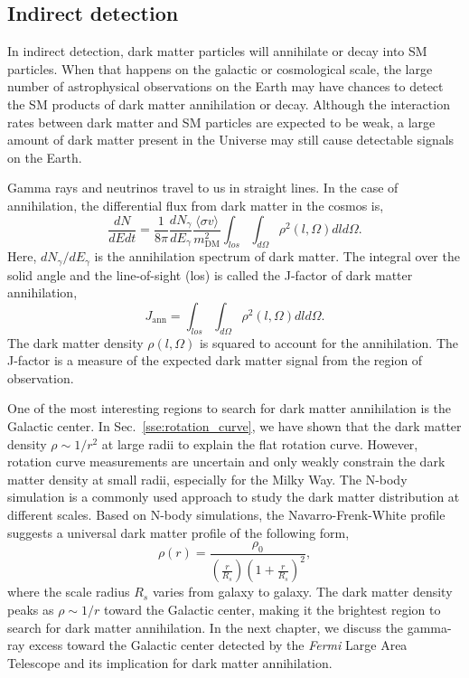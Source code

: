 \documentclass[doublespace,nopageskip]{VTthesis} %
\newcommand{\sigmav}{\langle\sigma v\rangle}
\begin{document}
\subsection{Indirect detection}\label{sse:indirect}

In indirect detection, dark matter particles will annihilate or decay into SM particles. When that happens on the galactic or cosmological scale, the large number of astrophysical observations on the Earth may have chances to detect the SM products of dark matter annihilation or decay. Although the interaction rates between dark matter and SM particles are expected to be weak, a large amount of dark matter present in the Universe may still cause detectable signals on the Earth.

Gamma rays and neutrinos travel to us in straight lines. In the case of annihilation, the differential flux from dark matter in the cosmos is,
\begin{equation}\label{eq:ann}
    \frac{dN}{dEdt} = \frac{1}{8\pi}\frac{dN_\gamma}{dE_\gamma}\frac{\sigmav}{m_\mathrm{DM}^2}\int_{los}\int_{d\Omega}\rho^2(l,\Omega)dld\Omega.
\end{equation}
Here, $dN_\gamma/dE_\gamma$ is the annihilation spectrum of dark matter. The integral over the solid angle and the line-of-sight (los) is called the J-factor of dark matter annihilation,
\begin{equation}\label{eq:jfactor}
    J_\mathrm{ann} = \int_{los}\int_{d\Omega}\rho^2(l,\Omega)dld\Omega.
\end{equation}
The dark matter density $\rho(l,\Omega)$ is squared to account for the annihilation. The J-factor is a measure of the expected dark matter signal from the region of observation.

One of the most interesting regions to search for dark matter annihilation is the Galactic center. In Sec.~\ref{sse:rotation_curve}, we have shown that the dark matter density $\rho \sim 1/r^2$ at large radii to explain the flat rotation curve. However, rotation curve measurements are uncertain and only weakly constrain the dark matter density at small radii, especially for the Milky Way. The N-body simulation is a commonly used approach to study the dark matter distribution at different scales. Based on N-body simulations, the Navarro-Frenk-White profile~\cite{1996ApJ...462..563N} suggests a universal dark matter profile of the following form,
\begin{equation}
    \rho(r) = \frac{\rho_0}{(\frac{r}{R_s})(1+\frac{r}{R_s})^2},
\end{equation}
where the scale radius $R_s$ varies from galaxy to galaxy. The dark matter density peaks as $\rho \sim 1/r$ toward the Galactic center, making it the brightest region to search for dark matter annihilation. In the next chapter, we discuss the gamma-ray excess toward the Galactic center detected by the \textit{Fermi} Large Area Telescope and its implication for dark matter annihilation.
\end{document}
